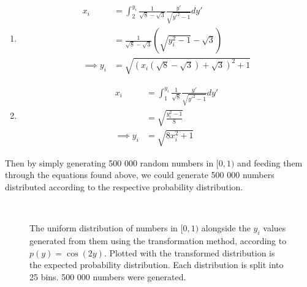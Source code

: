 \documentclass[11pt]{article}
\begin{document}
\begin{enumerate}
\begin{enumerate}
\begin{enumerate}[label=\roman*)]
            \item \label{itm:q2aii}
            \begin{align*}
                x_i&=\int_2^{y_i}\frac{1}{\sqrt 8 - \sqrt 3}\frac{y'}{\sqrt{y'^2-1}}dy'\\
                &=\frac{1}{\sqrt 8 - \sqrt 3}\left(\sqrt{y_i^2-1}-\sqrt 3\right)\\
                \implies y_i&=\sqrt{(x_i(\sqrt{8}-\sqrt{3})+\sqrt{3})^2+1}
            \end{align*}

            \item \label{itm:q2aiii}
            \begin{align*}
                x_i&=\int_1^{y_i}\frac{1}{\sqrt 8}\frac{y'}{\sqrt{y'^2-1}}dy'\\
                &=\sqrt{\frac{y_i^2-1}{8}}\\
                \implies y_i&=\sqrt{8x_i^2+1}
            \end{align*}
        \end{enumerate}
        Then by simply generating 500 000 random numbers in $[0,1)$ and feeding them through the equations found above, we could generate 500 000 numbers distributed according to the respective probability distribution.

        \begin{figure}[H]%
            \centering
            \,
            \caption{The uniform distribution of numbers in $[0,1)$ alongside the $y_i$ values generated from them using the transformation method, according to $p(y)=\cos(2y)$. Plotted with the transformed distribution is the expected probability distribution. Each distribution is split into 25 bins. 500 000 numbers were generated.}
            \label{fig:q2ai}
        \end{figure}


\end{enumerate}
\end{enumerate}
\end{document}
